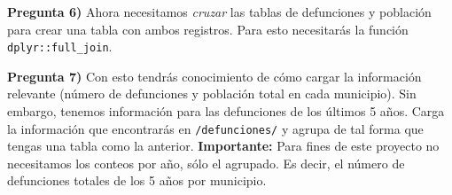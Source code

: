 \documentclass[
]{article}
\newenvironment{Shaded}{\begin{snugshade}}{\end{snugshade}}
\newcommand{\CommentTok}[1]{\textcolor[rgb]{0.56,0.35,0.01}{\textit{#1}}}
\newcommand{\DataTypeTok}[1]{\textcolor[rgb]{0.13,0.29,0.53}{#1}}
\newcommand{\KeywordTok}[1]{\textcolor[rgb]{0.13,0.29,0.53}{\textbf{#1}}}
\newcommand{\NormalTok}[1]{#1}
\newcommand{\OperatorTok}[1]{\textcolor[rgb]{0.81,0.36,0.00}{\textbf{#1}}}
\newcommand{\StringTok}[1]{\textcolor[rgb]{0.31,0.60,0.02}{#1}}
\begin{document}
\textbf{Pregunta 6)} Ahora necesitamos \emph{cruzar} las tablas de
defunciones y población para crear una tabla con ambos registros. Para
esto necesitarás la función \texttt{dplyr::full\_join}.

\begin{Shaded}
\end{Shaded}

\textbf{Pregunta 7)} Con esto tendrás conocimiento de cómo cargar la
información relevante (número de defunciones y población total en cada
municipio). Sin embargo, tenemos información para las defunciones de los
últimos 5 años. Carga la información que encontrarás en
\texttt{/defunciones/} y agrupa de tal forma que tengas una tabla como
la anterior. \textbf{Importante: } Para fines de este proyecto no
necesitamos los conteos por año, sólo el agrupado. Es decir, el número
de defunciones totales de los 5 años por municipio.
\end{document}
